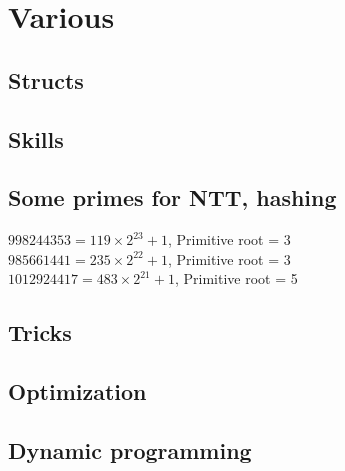 \chapter{Various}

\section{Structs}

\section{Skills}

\section{Some primes for NTT, hashing}
$998244353 = 119 \times 2^{23} + 1$, Primitive root = 3 \\
$985661441 = 235 \times 2^{22} + 1$, Primitive root = 3 \\
$1012924417 = 483 \times 2^{21} + 1$, Primitive root = 5

\section{Tricks}

\section{Optimization}

\section{Dynamic programming}

